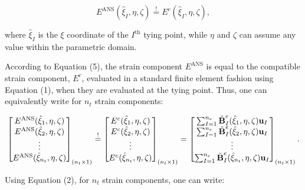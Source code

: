 \documentclass[12pt]{article}
\begin{document}
\begin{equation}
E^{\text{ANS}}(\hat{\xi}_I,\eta,\zeta) \overset{!}{=} E^c (\hat{\xi}_I, \eta, \zeta),
\end{equation}

\noindent
where $\hat{\xi}_I$ is the $\xi$ coordinate of the $I^{\text{th}}$ tying point, while $\eta$ and $\zeta$ can assume any value within the parametric domain.

According to Equation (5), the strain component $E^{\text{ANS}}$ is equal to the compatible strain component, $E^{c}$, evaluated in a standard finite element fashion using Equation (1), when they are evaluated at the tying point. Thus, one can equivalently write for $n_t$ strain components:

\begin{equation}
\begin{bmatrix}
E^{\text{ANS}}(\hat{\xi}_1,\eta,\zeta) \\
E^{\text{ANS}}(\hat{\xi}_2,\eta,\zeta) \\
\vdots \\
E^{\text{ANS}}(\hat{\xi}_{n_t},\eta,\zeta) \\
\end{bmatrix}_{(n_t \times 1)} \overset{!}{=}
\begin{bmatrix}
E^{c}(\hat{\xi}_1,\eta,\zeta) \\
E^{c}(\hat{\xi}_2,\eta,\zeta) \\
\vdots \\
E^{c}(\hat{\xi}_{n_t},\eta,\zeta) \\
\end{bmatrix}_{(n_t \times 1)} =
\begin{bmatrix}
\sum_{I=1}^{n_e} \tilde{\text{\bf{B}}}_I^e (\hat{\xi}_1, \eta, \zeta) \text{\bf{u}}_I\\
\sum_{I=1}^{n_e} \tilde{\text{\bf{B}}}_I^e (\hat{\xi}_2, \eta, \zeta) \text{\bf{u}}_I\\
\vdots \\
\sum_{I=1}^{n_e} \tilde{\text{\bf{B}}}_I^e (\hat{\xi}_{n_t}, \eta, \zeta) \text{\bf{u}}_I\\
\end{bmatrix}_{(n_t \times 1)}.
\end{equation}

Using Equation (2), for $n_t$ strain components, one can write:
\end{document}
